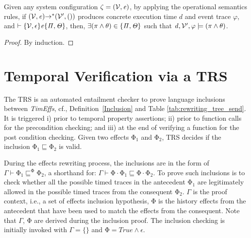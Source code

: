 \documentclass[acmsmall,10pt,review]{acmart}
\newcommand{\env}{\code{\mathcal{V}}}
\newcommand{\es}{\theta}
\newcommand{\timedEffects}{\emph{TimEffs}}
\newcommand{\effect}{{\ensuremath{\mathrm{\Phi}}}}
\newcommand{\code}[1]{{\tt{\ensuremath{\m{#1}}}}}
\newcommand{\CONTAIN}{\sqsubseteq}
\newcommand{\m}{\mathit}
\newcommand\tabref[1]{Table \textcolor{black}{\ref{#1}}.}
\newcommand\appref[1]{Appendix~\textcolor{blue}{\ref{#1}}}
\newcommand\defref[1]{Definition~\textcolor{blue}{\ref{#1}}}
\begin{document}
{\begin{theorem}\label{Soundness_forward_rules}
  Given any system configuration \code{\zeta = (\env, e)}, by applying the operational
  semantics rules, 
  if \code{(\env, e) {\rightarrow^*} (\env^\prime, ())} produces concrete 
  execution time \code{d} and event trace \code{\varphi}, and \code{ \vdash  
  \s{\env, \epsilon} e \s{\Pi, \Theta}}, then, 
  \code{\exists (\pi\wedge \es) \in \s{\Pi, \Theta} } such that 
  \code{d, \env^\prime, \varphi  \models (\pi\wedge \es)}. 

  \end{theorem}
  
  
  \begin{proof}
    By induction. 
  \end{proof}


\section{Temporal Verification via a TRS}
\label{sec:Entailment_Prover}


The TRS  is an automated entailment checker to prove language 
inclusions between \timedEffects, cf., \defref{Inclusion} and 
\tabref{tab:rewriting_tree_send} It is triggered i) prior to 
temporal property assertions; ii) prior to function calls for the 
precondition checking; and iii) at the end of verifying a function 
for the post condition checking. Given two effects 
\code{\effect_1} and \code{\effect_2}, TRS decides if the inclusion \code{\effect_1 \CONTAIN  \effect_2 } is valid. 

During the effects rewriting process, the inclusions are in the form of \code{\Gamma \vdash  \effect_1 \CONTAIN^{\effect}  \effect_2 }, a shorthand for: \code{\Gamma \vdash  \effect \cdot \effect_1 \CONTAIN   \effect \cdot  \effect_2}. To prove such inclusions is to check whether all the possible timed traces in the antecedent \code{\effect_1} are legitimately allowed  in the possible timed traces from the consequent \code{\effect_2}.
\code{\Gamma} is the proof context, i.e., a set of effects inclusion hypothesis, \code{\effect} is the history effects from the antecedent that have been used to match the effects from the consequent.
Note that \code{\Gamma}, \code{\effect} are derived during the inclusion proof. 
The inclusion checking is initially invoked with \code{\Gamma{=}\{\}} and 
\code{\effect{=} True \wedge  \epsilon}. 







}
\end{document}
